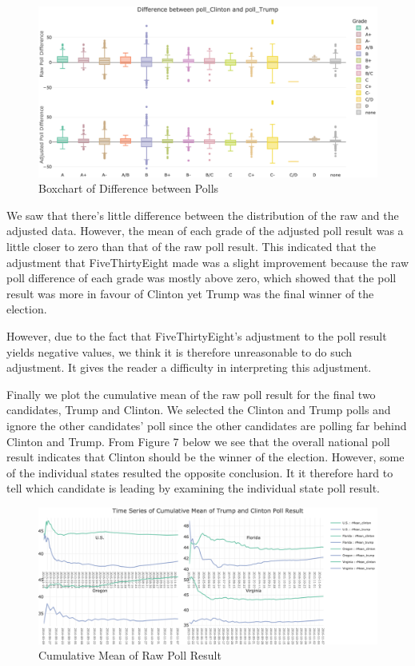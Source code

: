 \documentclass[
  12pt,
]{article}
\begin{document}
\begin{figure}
\centering
\includegraphics{./Figures/boxchart.png}
\caption{Boxchart of Difference between Polls}
\end{figure}

We saw that there's little difference between the distribution of the
raw and the adjusted data. However, the mean of each grade of the
adjusted poll result was a little closer to zero than that of the raw
poll result. This indicated that the adjustment that FiveThirtyEight
made was a slight improvement because the raw poll difference of each
grade was mostly above zero, which showed that the poll result was more
in favour of Clinton yet Trump was the final winner of the election.

However, due to the fact that FiveThirtyEight's adjustment to the poll
result yields negative values, we think it is therefore unreasonable to
do such adjustment. It gives the reader a difficulty in interpreting
this adjustment.

Finally we plot the cumulative mean of the raw poll result for the final
two candidates, Trump and Clinton. We selected the Clinton and Trump
polls and ignore the other candidates' poll since the other candidates
are polling far behind Clinton and Trump. From Figure 7 below we see
that the overall national poll result indicates that Clinton should be
the winner of the election. However, some of the individual states
resulted the opposite conclusion. It it therefore hard to tell which
candidate is leading by examining the individual state poll result.

\begin{figure}
\centering
\includegraphics{./Figures/cMeanchart.png}
\caption{Cumulative Mean of Raw Poll Result}
\end{figure}
\end{document}
